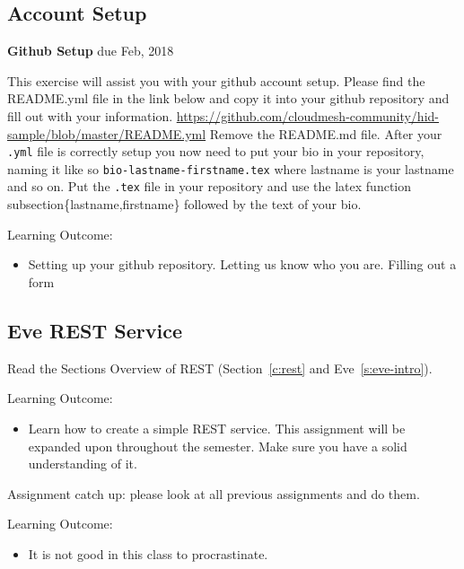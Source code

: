 \subsection{Account Setup}

\begin{exercise} {\bf Github Setup} due Feb, 2018

This exercise will assist you with your github account setup. Please
find the README.yml file in the link below and copy it into your
github repository and fill out with your
information. \url{https://github.com/cloudmesh-community/hid-sample/blob/master/README.yml}
Remove the README.md file. After your \verb|.yml| file is correctly setup you
now need to put your bio in your repository, naming it like so
\verb|bio-lastname-firstname.tex| where lastname is your lastname and so
on. Put the \verb|.tex| file in your repository and use the latex function
subsection\{lastname,firstname\} followed by the text of your bio.

Learning Outcome:
\begin{itemize}
\item Setting up your github repository. Letting us know who you
  are. Filling out a form
\end{itemize}

\end{exercise}

\subsection{Eve REST Service}
\label{E:rest-eve}
\begin{exercise}
Read the Sections Overview of REST (Section~\ref{c:rest} and
Eve~\ref{s:eve-intro}).

Learning Outcome:
\begin{itemize}
\item Learn how to create a simple REST service. This assignment will
  be expanded upon throughout the semester. Make sure you have a solid
  understanding of it.
\end{itemize}
\end{exercise}

\begin{exercise}
Assignment catch up: please look at all previous assignments and do
them. 

Learning Outcome:
\begin{itemize}
\item It is not good in this class to procrastinate.
\end{itemize}
\end{exercise}

